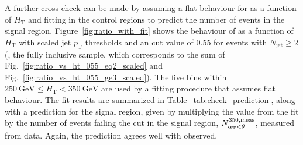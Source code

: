 
A further cross-check can be made by assuming a flat behaviour for
\RaT as a function of $H_{\mathrm{T}}$ and fitting in the control
regions to predict the number of events in the signal
region. Figure~\ref{fig:ratio_with_fit} shows the behaviour of \RaT as
a function of $H_{\mathrm{T}}$ with scaled jet $p_{\mathrm{T}}$
thresholds and an \aT cut value of 0.55 for events with
$N_{\mathrm{jet}} \geq 2$ (\ie, the fully inclusive sample, which
corresponds to the sum of Fig.~\ref{fig:ratio_vs_ht_055_eq2_scaled}
and Fig.~\ref{fig:ratio_vs_ht_055_ge3_scaled}). The five bins within
$250~\mathrm{GeV} \leq H_{\mathrm{T}} < 350~\mathrm{GeV}$ are used by a
fitting procedure that assumes flat behaviour. The fit results are
summarized in Table~\ref{tab:check_prediction}, along with a
prediction for the signal region, given by multiplying the value from
the fit by the number of events failing the \aT cut in the signal
region, $N^{350,\mathrm{meas}}_{\alpha_{\mathrm{T}}<\theta}$, measured from
data. Again, the prediction agrees well with observed.

